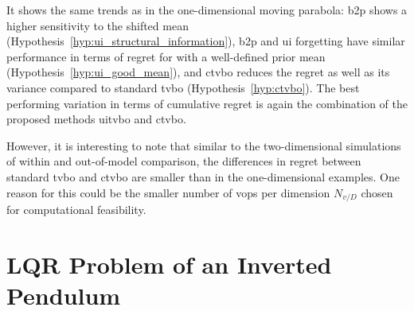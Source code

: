 It shows the same trends as in the one-dimensional moving parabola: \gls{b2p} shows a higher sensitivity to the shifted mean (Hypothesis~\ref{hyp:ui_structural_information}), \gls{b2p} and \gls{ui} forgetting have similar performance in terms of regret for with a well-defined prior mean (Hypothesis~\ref{hyp:ui_good_mean}), and \gls{ctvbo} reduces the regret as well as its variance compared to standard \gls{tvbo} (Hypothesis~\ref{hyp:ctvbo}). The best performing variation in terms of cumulative regret is again the combination of the proposed methods \gls{uitvbo} and \gls{ctvbo}.

However, it is interesting to note that similar to the two-dimensional simulations of within and out-of-model comparison, the differences in regret between standard \gls{tvbo} and \gls{ctvbo} are smaller than in the one-dimensional examples. One reason for this could be the smaller number of \glspl{vop} per dimension $N_{v/D}$ chosen for computational feasibility.

\section{LQR Problem of an Inverted Pendulum}
\label{sec:LQR}

